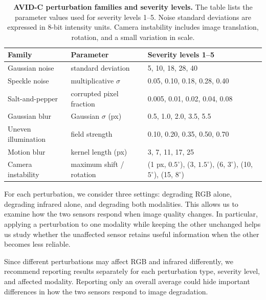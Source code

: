 \documentclass[10pt]{article}
\newcommand{\corrupt}{\textsc{AVID-C}}
\begin{document}
\begin{table}[t]
\centering
\caption{\textbf{\corrupt{} perturbation families and severity levels.}
The table lists the parameter values used for severity levels 1--5. Noise standard deviations are expressed in 8-bit intensity units. Camera instability includes image translation, rotation, and a small variation in scale.}
\label{tab:corruptions}
\small
\begin{tabularx}{\linewidth}{@{}l l X@{}}
\toprule
Family & Parameter & Severity levels 1--5 \\
\midrule

Gaussian noise
& standard deviation
& 5, 10, 18, 28, 40 \\

Speckle noise
& multiplicative $\sigma$
& 0.05, 0.10, 0.18, 0.28, 0.40 \\

Salt-and-pepper
& corrupted pixel fraction
& 0.005, 0.01, 0.02, 0.04, 0.08 \\

Gaussian blur
& Gaussian $\sigma$ (px)
& 0.5, 1.0, 2.0, 3.5, 5.5 \\

Uneven illumination
& field strength
& 0.10, 0.20, 0.35, 0.50, 0.70 \\

Motion blur
& kernel length (px)
& 3, 7, 11, 17, 25 \\

Camera instability
& maximum shift / rotation
& (1 px, $0.5^\circ$), (3, $1.5^\circ$), (6, $3^\circ$),
  (10, $5^\circ$), (15, $8^\circ$) \\

\bottomrule
\end{tabularx}
\end{table}

For each perturbation, we consider three settings: degrading RGB alone, degrading infrared alone, and degrading both modalities. This allows us to examine how the two sensors respond when image quality changes. In particular, applying a perturbation to one modality while keeping the other unchanged helps us study whether the unaffected sensor retains useful information when the other becomes less reliable.

Since different perturbations may affect RGB and infrared differently, we recommend reporting results separately for each perturbation type, severity level, and affected modality. Reporting only an overall average could hide important differences in how the two sensors respond to image degradation.
\end{document}
